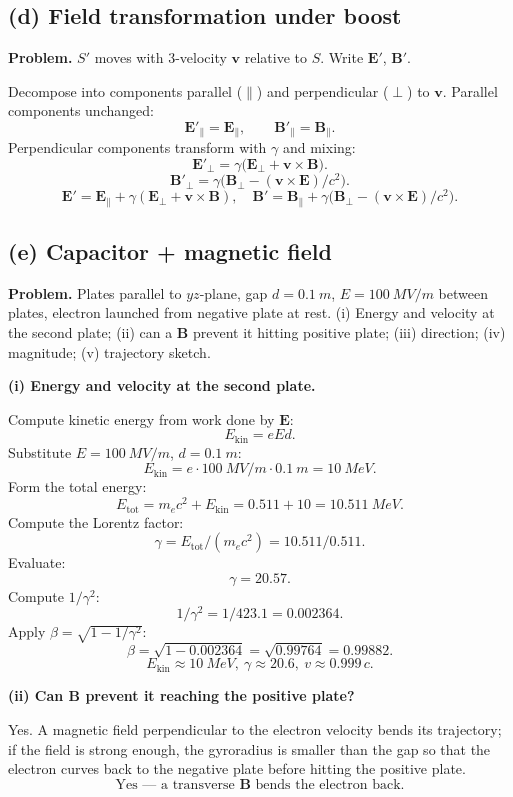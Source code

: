 \documentclass[11pt]{article}
\begin{document}
\subsection*{(d) Field transformation under boost}

\textbf{Problem.} $S'$ moves with 3-velocity $\bm v$ relative to $S$. Write $\bm E'$, $\bm B'$.

Decompose into components parallel ($\parallel$) and perpendicular ($\perp$) to $\bm v$. Parallel components unchanged:
\[ \bm E'_\parallel = \bm E_\parallel,\qquad \bm B'_\parallel = \bm B_\parallel. \]
Perpendicular components transform with $\gamma$ and mixing:
\[ \bm E'_\perp = \gamma\bigl(\bm E_\perp + \bm v\times\bm B\bigr). \]
\[ \bm B'_\perp = \gamma\bigl(\bm B_\perp - (\bm v\times\bm E)/c^2\bigr). \]
\[ \boxed{\;\bm E' = \bm E_\parallel + \gamma(\bm E_\perp + \bm v\times\bm B),\quad \bm B' = \bm B_\parallel + \gamma\bigl(\bm B_\perp - (\bm v\times\bm E)/c^2\bigr).\;} \]

\subsection*{(e) Capacitor + magnetic field}

\textbf{Problem.} Plates parallel to $yz$-plane, gap $d=\SI{0.1}{m}$, $E=\SI{100}{MV/m}$ between plates, electron launched from negative plate at rest. (i) Energy and velocity at the second plate; (ii) can a $\bm B$ prevent it hitting positive plate; (iii) direction; (iv) magnitude; (v) trajectory sketch.

\textbf{(i) Energy and velocity at the second plate.}

Compute kinetic energy from work done by $\bm E$:
\[ E_\text{kin} = eEd. \]
Substitute $E = \SI{100}{MV/m}$, $d=\SI{0.1}{m}$:
\[ E_\text{kin} = e\cdot\SI{100}{MV/m}\cdot\SI{0.1}{m} = \SI{10}{MeV}. \]
Form the total energy:
\[ E_\text{tot} = m_e c^2 + E_\text{kin} = 0.511 + 10 = \SI{10.511}{MeV}. \]
Compute the Lorentz factor:
\[ \gamma = E_\text{tot}/(m_e c^2) = 10.511/0.511. \]
Evaluate:
\[ \gamma = 20.57. \]
Compute $1/\gamma^2$:
\[ 1/\gamma^2 = 1/423.1 = 0.002364. \]
Apply $\beta = \sqrt{1-1/\gamma^2}$:
\[ \beta = \sqrt{1-0.002364} = \sqrt{0.99764} = 0.99882. \]
\[ \boxed{\;E_\text{kin}\approx \SI{10}{MeV},\ \gamma\approx 20.6,\ v\approx 0.999\,c.\;} \]

\textbf{(ii) Can $\bm B$ prevent it reaching the positive plate?}

Yes. A magnetic field perpendicular to the electron velocity bends its trajectory; if the field is strong enough, the gyroradius is smaller than the gap so that the electron curves back to the negative plate before hitting the positive plate.
\[ \boxed{\;\text{Yes --- a transverse }\bm B\text{ bends the electron back.}\;} \]
\end{document}
